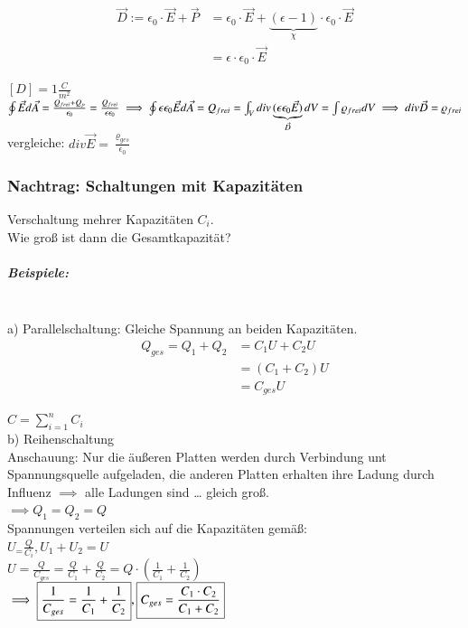 \documentclass[11pt]{article}
\begin{document}
\begin{align*}
	\vec{D}:=\epsilon_0\cdot\vec{E}+\vec{P}&=\epsilon_0\cdot\vec{E}+\underbrace{(\epsilon-1)}_{\chi}\cdot\epsilon_0\cdot\vec{E}\\
	&=\epsilon\cdot\epsilon_0\cdot\vec{E}
\end{align*}

$[D]=1\frac{C}{m^2}$\\

$\oint\vec{E}d\vec{A}=\frac{Q_{frei}+Q_p}{\epsilon_0}=\frac{Q_{frei}}{\epsilon\epsilon_0}\\
\implies \oint\epsilon\epsilon_0\vec{E}d\vec{A}=Q_{frei}\\
=\int_V div\underbrace{(\epsilon\epsilon_0\vec{E})}_{\vec{D}}dV=\int \varrho_{frei}dV\\
\implies div \vec{D}=\varrho_{frei}$\\

vergleiche: $div \vec{E}=\frac{\varrho_{ges}}{\epsilon_0}$

\subsubsection{Nachtrag: Schaltungen mit Kapazitäten}

Verschaltung mehrer Kapazitäten $ C_i $.\\
Wie groß ist dann die Gesamtkapazität?\\

\subparagraph{Beispiele:}
\hfill \\
a) Parallelschaltung: Gleiche Spannung an beiden Kapazitäten.\\

\begin{align*}
	Q_{ges}=Q_1+Q_2&=C_1U+C_2U\\
	&=(C_1+C_2)U\\
	&=C_{ges}U
\end{align*}

$\boxed{C=\sum_{i=1}^{n}C_i}$\\

b) Reihenschaltung\\

Anschauung: Nur die äußeren Platten werden durch Verbindung unt Spannungsquelle aufgeladen, die anderen Platten erhalten ihre Ladung durch Influenz $\implies$ alle Ladungen sind … gleich groß.\\
$\implies Q_1=Q_2=Q$\\

Spannungen verteilen sich auf die Kapazitäten gemäß:\\
$U_=\frac{Q}{C_i}, U_1+U_2=U$\\

$U=\frac{Q}{C_{ges}}=\frac{Q}{C_1}+\frac{Q}{C_2}=Q\cdot(\frac{1}{C_1}+\frac{1}{C_2})$\\

$\implies \boxed{\frac{1}{C_{ges}}=\frac{1}{C_1}+\frac{1}{C_2}}, \hfil \boxed{C_{ges}=\frac{C_1\cdot C_2}{C_1+C_2}}$
\end{document}
